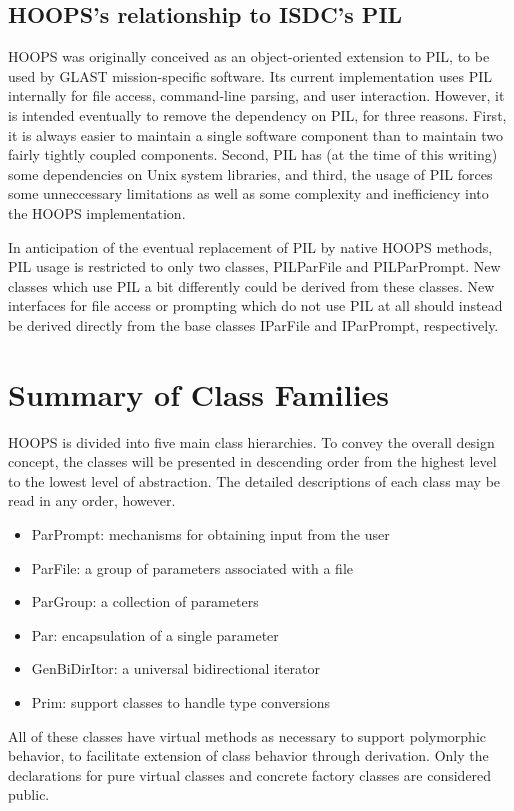 \subsection{HOOPS's relationship to ISDC's PIL}
HOOPS was originally conceived as an object-oriented
extension to PIL, to be used by GLAST mission-specific
software. Its current implementation uses PIL internally
for file access, command-line parsing, and user
interaction. However, it is intended eventually to
remove the dependency on PIL, for three reasons. First,
it is always easier to maintain a single software
component than to maintain two fairly tightly coupled
components. Second, PIL has (at the time of this writing)
some dependencies on Unix system libraries, and third,
the usage of PIL forces some unneccessary limitations
as well as some complexity and inefficiency into the
HOOPS implementation.

In anticipation of the eventual replacement of PIL by
native HOOPS methods, PIL usage is restricted to only two
classes, PILParFile and PILParPrompt. New classes which
use PIL a bit differently could be derived from these classes.
New interfaces for file access or prompting which do not
use PIL at all should instead be derived directly from the base
classes IParFile and IParPrompt, respectively.

\section{Summary of Class Families}
HOOPS is divided into five main class hierarchies. To
convey the overall design concept, the classes will be
presented in descending order from the highest level
to the lowest level of abstraction. The detailed
descriptions of each class may be read in any order,
however.

\begin{itemize}
\item ParPrompt: mechanisms for obtaining input from the user
\item ParFile: a group of parameters associated with a file
\item ParGroup: a collection of parameters
\item Par: encapsulation of a single parameter
\item GenBiDirItor: a universal bidirectional iterator
\item Prim: support classes to handle type conversions
\end{itemize}

All of these classes have virtual methods as necessary to
support polymorphic behavior, to facilitate extension
of class behavior through derivation. Only the declarations
for pure virtual classes and concrete factory classes are
considered public.


